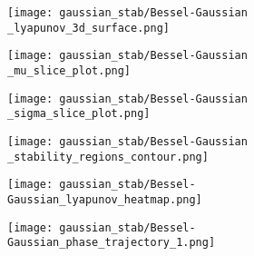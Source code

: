 \begin{figure}[H]
        \centering
        \begin{subfigure}[b]{0.31\textwidth}
            \centering
            \texttt{[image: gaussian\_stab/Bessel-Gaussian \_lyapunov\_3d\_surface.png]}
            \label{fig:gaussian_stability1}
            \caption{}
        \end{subfigure}
        \begin{subfigure}[b]{0.31\textwidth}
            \centering
            \texttt{[image: gaussian\_stab/Bessel-Gaussian \_mu\_slice\_plot.png]}
            \label{fig:gaussian_stability2}
            \caption{}
        \end{subfigure}
        \begin{subfigure}[b]{0.31\textwidth}
            \centering
            \texttt{[image: gaussian\_stab/Bessel-Gaussian \_sigma\_slice\_plot.png]}
            \label{fig:gaussian_stability3}
            \caption{}
        \end{subfigure}
        
        \vspace{0.2cm} %
        
        \begin{subfigure}[b]{0.31\textwidth}
            \centering
            \texttt{[image: gaussian\_stab/Bessel-Gaussian \_stability\_regions\_contour.png]}
            \label{fig:gaussian_stability4}
            \caption{}
        \end{subfigure}
        \begin{subfigure}[b]{0.31\textwidth}
            \centering
            \texttt{[image: gaussian\_stab/Bessel-Gaussian\_lyapunov\_heatmap.png]}
            \label{fig:gaussian_stability5}
            \caption{}
        \end{subfigure}
        \begin{subfigure}[b]{0.31\textwidth}
            \centering
            \texttt{[image: gaussian\_stab/Bessel-Gaussian\_phase\_trajectory\_1.png]}
            \label{fig:gaussian_stability6}
            \caption{}
        \end{subfigure}
        
        \vspace{0.2cm} %
        

\end{figure}
